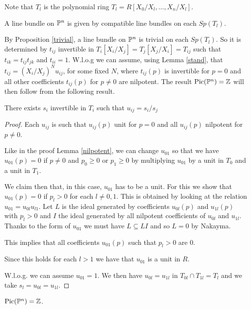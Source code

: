 Note that $T_l$ is the polynomial ring $T_l = R[X_0/X_l,\dots,X_n/X_l]$.

A line bundle on $\mathbb{P}^n$ is given by compatible line bundles on each $Sp(T_l)$.

By Proposition \ref{trivial}, a line bundle on $\mathbb{P}^n$ is trivial on each $Sp(T_l)$.
So it is determined by $t_{ij}$ invertible in $T_i[X_i/X_j] = T_j[X_j/X_i] = T_{ij}$
such that $t_{ik} = t_{ij}t_{jk}$ and $t_{ii} = 1$. W.l.o.g we can assume, using Lemma \ref{stand}, that
$t_{ij} = (X_i/X_j)^N u_{ij}$, for some fixed $N$, where $t_{ij}(p)$ is invertible for $p = 0$
and all other coefficients $t_{ij}(p)$ for $p\neq 0$
are nilpotent. The result $\mathrm{Pic}(\mathbb{P}^n) = \mathbb{Z}$ will then follow from the following result.

\begin{proposition}
  There exists $s_i$ invertible in $T_i$ such that $u_{ij} = s_i/s_j$ 
\end{proposition}

\begin{proof}
  Each $u_{ij}$ is such that $u_{ij}(p)$ unit for $p=0$ and
  all $u_{ij}(p)$ nilpotent for $p\neq 0$.

  Like in the proof Lemma \ref{nilpotent}, we can change $u_{01}$ so that
  we have $u_{01}(p) = 0$ if $p\neq 0$ and $p_0\geqslant 0$ or $p_1\geqslant 0$ by multiplying $u_{01}$ by a unit in $T_0$ and a unit in $T_1$.
  
  We claim then that, in this case, $u_{01}$ has to be a unit. For this we show that $u_{01}(p) = 0$
  if $p_l>0$ for each $l\neq 0,1$.
  This is obtained by looking at the relation $u_{01}= u_{0l}u_{l1}$. Let $L$ is the ideal generated by
  coefficients $u_{0l}(p)$ and $u_{1l}(p)$ with $p_l>0$ and $I$
  the ideal generated by all nilpotent coefficients of $u_{0l}$ and $u_{1l}$.
  Thanks to the form of $u_{01}$ we must have $L\subseteq LI$ and so $L=0$ by Nakayma.

  This implies that all coefficients $u_{01}(p)$ such that $p_l>0$ are $0$.

  Since this holds for each $l>1$ we have that $u_{01}$ is a unit in $R$.

  W.l.o.g. we can assume $u_{01}= 1$. We then have $u_{0l} = u_{1l}$ in $T_{0l}\cap T_{1l} = T_l$
  and we take $s_l = u_{0l} = u_{1l}$.
\end{proof}

\begin{corollary}
  $\mathrm{Pic}(\mathbb{P}^n) = \mathbb{Z}$.
\end{corollary}

